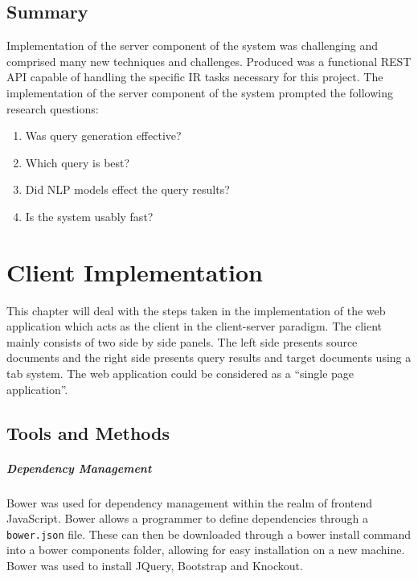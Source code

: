 \documentclass{l4proj}
\newcommand{\code}[1]{\texttt{#1}}
\begin{document}
\section{Summary} \label{serversummary}
Implementation of the server component of the system was challenging and comprised many new techniques and challenges. Produced was a functional REST API capable of handling the specific IR tasks necessary for this project.
The implementation of the server component of the system prompted the following research questions:
\begin{center}
\begin{enumerate}[label=\textbf{Server.\arabic*}]
\item Was query generation effective?
\item Which query is best?
\item Did NLP models effect the query results?
\item Is the system usably fast?
\end{enumerate}
\end{center}

\chapter{Client Implementation} \label{clientimplementation}
This chapter will deal with the steps taken in the implementation of the web application which acts as the client in the client-server paradigm. The client mainly consists of two side by side panels. The left side presents source documents and the right side presents query results and target documents using a tab system. The web application could be considered as a ``single page application''.

\section{Tools and Methods}
\paragraph{Dependency Management}
Bower was used for dependency management within the realm of frontend JavaScript. Bower allows a programmer to define dependencies through a \code{bower.json} file. These can then be downloaded through a bower install command into a bower components folder, allowing for easy installation on a new machine. Bower was used to install JQuery, Bootstrap and Knockout.
\end{document}
